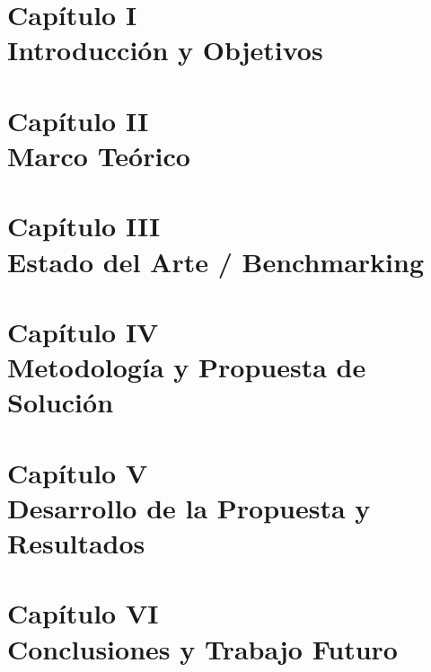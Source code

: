 \documentclass[12pt]{report}
\renewcommand{\headrulewidth}{0pt}
\begin{document}
\renewcommand{\listfigurename}{LISTA DE FIGURAS}
\renewcommand{\listtablename}{LISTA DE TABLAS}

\listoffigures

\listoftables

\chapter*{Capítulo I\\Introducción y Objetivos}
\renewcommand{\headwidth}{\textwidth}
\renewcommand{\headrulewidth}{1pt}
\renewcommand\thesection{\arabic{section}}
\fancyhead[L]{\chaptername{} \rightmark}
\fancyhead[R]{\thepage}
\fancyfoot{}



\chapter*{Capítulo II\\Marco Teórico}


\chapter*{Capítulo III\\Estado del Arte / Benchmarking}
  


\chapter*{Capítulo IV\\Metodología y Propuesta de Solución}



\chapter*{Capítulo V\\Desarrollo de la Propuesta y Resultados}


\chapter*{Capítulo VI\\Conclusiones y Trabajo Futuro}
\end{document}
